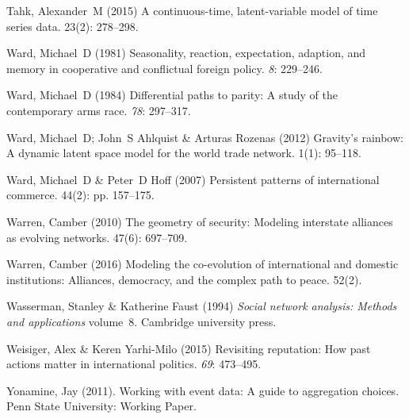 \documentclass[3p,times,twocolumn,authoryear,12pt]{elsarticle}
\begin{document}
\begin{thebibliography}{}
Tahk, Alexander~M (2015) A continuous-time, latent-variable model of time
  series data.
 { 23\/}(2): 278--298.

Ward, Michael~D (1981) Seasonality, reaction, expectation, adaption, and memory
  in cooperative and conflictual foreign policy.
 {\em 8}: 229--246.

Ward, Michael~D (1984) Differential paths to parity: A study of the
  contemporary arms race.
 {\em {78}}: 297--317.

Ward, Michael~D; John~S Ahlquist  \& Arturas Rozenas (2012) Gravity's rainbow:
  A dynamic latent space model for the world trade network.
 { 1\/}(1): 95--118.

Ward, Michael~D  \& Peter~D Hoff (2007) Persistent patterns of international
  commerce.
 { 44\/}(2): pp. 157--175.

Warren, Camber (2010) The geometry of security: Modeling interstate alliances
  as evolving networks.
 { 47\/}(6): 697--709.

Warren, Camber (2016) Modeling the co-evolution of international and domestic
  institutions: Alliances, democracy, and the complex path to peace.
 { 52\/}(2).

Wasserman, Stanley  \& Katherine Faust (1994) {\em Social network analysis:
  Methods and applications} volume~8.
\newblock Cambridge university press.

Weisiger, Alex  \& Keren Yarhi-Milo (2015) Revisiting reputation: How past
  actions matter in international politics.
 {\em 69}: 473--495.

Yonamine, Jay (2011).
\newblock Working with event data: A guide to aggregation choices.
\newblock Penn State University: Working Paper.

\end{thebibliography}

%  
%
%
\end{document}
